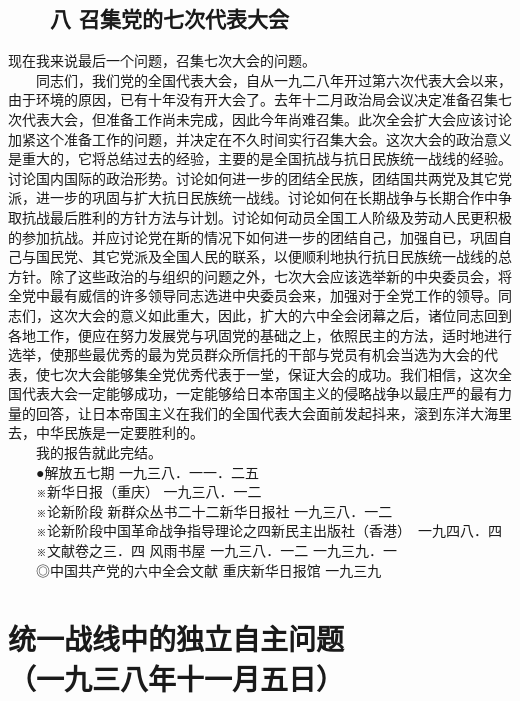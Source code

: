 \documentclass[cn,11pt,chinese]{elegantbook}
\def\myformat#1{\hfil\hfil #1}
\begin{document}
\subsection*{\myformat{　　八 召集党的七次代表大会}}
现在我来说最后一个问题，召集七次大会的问题。\\
　　同志们，我们党的全国代表大会，自从一九二八年开过第六次代表大会以来，由于环境的原因，已有十年没有开大会了。去年十二月政治局会议决定准备召集七次代表大会，但准备工作尚未完成，因此今年尚难召集。此次全会扩大会应该讨论加紧这个准备工作的问题，并决定在不久时间实行召集大会。这次大会的政治意义是重大的，它将总结过去的经验，主要的是全国抗战与抗日民族统一战线的经验。讨论国内国际的政治形势。讨论如何进一步的团结全民族，团结国共两党及其它党派，进一步的巩固与扩大抗日民族统一战线。讨论如何在长期战争与长期合作中争取抗战最后胜利的方针方法与计划。讨论如何动员全国工人阶级及劳动人民更积极的参加抗战。并应讨论党在斯的情况下如何进一步的团结自己，加强自已，巩固自己与国民党、其它党派及全国人民的联系，以便顺利地执行抗日民族统一战线的总方针。除了这些政治的与组织的问题之外，七次大会应该选举新的中央委员会，将全党中最有威信的许多领导同志选进中央委员会来，加强对于全党工作的领导。同志们，这次大会的意义如此重大，因此，扩大的六中全会闭幕之后，诸位同志回到各地工作，便应在努力发展党与巩固党的基础之上，依照民主的方法，适时地进行选举，使那些最优秀的最为党员群众所信托的干部与党员有机会当选为大会的代表，使七次大会能够集全党优秀代表于一堂，保证大会的成功。我们相信，这次全国代表大会一定能够成功，一定能够给日本帝国主义的侵略战争以最庄严的最有力量的回答，让日本帝国主义在我们的全国代表大会面前发起抖来，滚到东洋大海里去，中华民族是一定要胜利的。\\
　　我的报告就此完结。\\
　　●解放五七期  一九三八．一一．二五\\
　　※新华日报（重庆）  一九三八．一二\\
　　※论新阶段 新群众丛书二十二新华日报社  一九三八．一二\\
　　※论新阶段中国革命战争指导理论之四新民主出版社（香港）　一九四八．四\\
　　※文献卷之三．四 风雨书屋  一九三八．一二  一九三九．一\\
　　◎中国共产党的六中全会文献 重庆新华日报馆  一九三九\\
\newpage\section*{\myformat{统一战线中的独立自主问题}\\\myformat{（一九三八年十一月五日）}}
\end{document}
